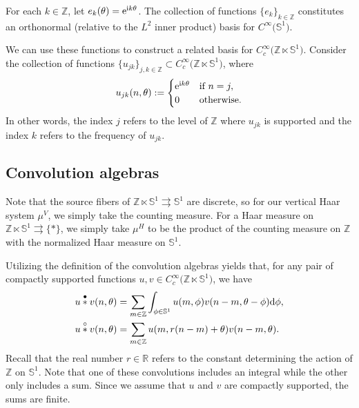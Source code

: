 \documentclass[pdftex]{sigma}
\numberwithin{equation}{section}
\theoremstyle{definition}
\newcommand{\BBR}{\mathbb{R}}
\newcommand{\BBZ}{\mathbb{Z}}
\newcommand{\BBS}{\mathbb{S}}
\newcommand{\stardot}{\overset{{\bullet}}{*}}
\newcommand{\starcirc}{\overset{\circ}{*}}
\newcommand{\grpd}{\rightrightarrows}
\begin{document}
For each $ k \in \BBZ $, let $e_k(\theta)={\rm e}^{{\rm i} k\theta}$. The collection of functions $ \{ e_k \}_{k \in \BBZ} $ constitutes an orthonormal \big(relative to the $L^2$ inner product\big) basis for $ C^\infty\big(\BBS^1\big) $.

We can use these functions to construct a related basis for $ C_c^\infty\big(\BBZ \ltimes \BBS^1\big) $. Consider the collection of functions $\{u_{jk}\}_{j,k\in\BBZ} \subset C_c^\infty\big(\BBZ \ltimes \BBS^1 \big)$, where
\begin{equation}\label{ONB-torus}
u_{jk}(n,\theta) := \begin{cases} {\rm e}^{{\rm i} k\theta} & \text{if } n=j,\\
0 & \text{otherwise}.\end{cases}
\end{equation}
In other words, the index $ j $ refers to the level of $ \BBZ $ where $ u_{jk}$ is supported and the index $ k $ refers to the frequency of $ u_{jk} $.

\subsection{Convolution algebras}
Note that the source fibers of $ \BBZ \ltimes \BBS^1 \grpd \BBS^1 $ are discrete, so for our vertical Haar system $ \mu^V $, we simply take the counting measure. For a Haar measure on $ \BBZ \ltimes \BBS^1 \grpd \{ * \} $, we simply take $ \mu^H $ to be the product of the counting measure on $ \BBZ $ with the normalized Haar measure on $ \BBS^1$.

Utilizing the definition of the convolution algebras yields that, for any pair of compactly supported functions $u,v\in C_c^\infty\big(\BBZ \ltimes \BBS^1\big)$, we have
\begin{align*} %
\begin{aligned}
&u\stardot v(n,\theta)= \sum_{m \in \BBZ} \int_{\phi \in \BBS^1} u(m,\phi)v(n-m,\theta-\phi){\rm d} \phi,\\
&u\starcirc v(n,\theta)= \sum_{m\in\BBZ} u(m,r(n-m)+\theta)v(n-m,\theta).
\end{aligned}
\end{align*}
Recall that the real number $ r \in \BBR $ refers to the constant determining the action of $ \BBZ $ on $ \BBS^1 $. Note that one of these convolutions includes an integral while the other only includes a sum. Since we assume that $ u $ and $ v $ are compactly supported, the sums are finite.
\end{document}
